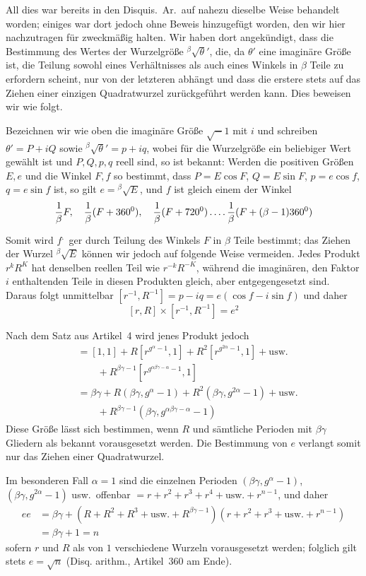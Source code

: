 \clearpage
{}
All dies war bereits in den Disquis.\ Ar.\ auf nahezu dieselbe Weise behandelt worden; einiges war dort jedoch ohne Beweis hinzugefügt worden, den wir hier nachzutragen für zweckmäßig halten. Wir haben dort angekündigt, dass die Bestimmung des Wertes der Wurzelgröße ${}^{\beta}\!\surd\theta'$, die, da $\theta'$ eine imaginäre Größe ist, die Teilung sowohl eines Verhältnisses als auch eines Winkels in $\beta$ Teile zu erfordern scheint, nur von der letzteren abhängt und dass die erstere stets auf das Ziehen einer einzigen Quadratwurzel zurückgeführt werden kann. Dies beweisen wir wie folgt.

Bezeichnen wir wie oben die imaginäre Größe $\surd-1$ mit $i$ und schreiben $\theta'=P+iQ$ sowie ${}^{\beta}\!\surd\theta'=p+iq$, wobei für die Wurzelgröße ein beliebiger Wert gewählt ist und $P,Q,p,q$ reell sind, so ist bekannt: Werden die positiven Größen $E,e$ und die Winkel $F,f$ so bestimmt, dass $P=E\cos F$, $Q=E\sin F$, $p=e\cos f$, $q=e\sin f$ ist, so gilt $e={}^{\beta}\!\surd E$, und $f$ ist gleich einem der Winkel
\[
\frac1\beta F,\quad\frac1\beta(F+360^0),\quad\frac1\beta(F+720^0)\mathinner{.\,.\,.\,.}\frac1\beta(F+(\beta-1)360^0)
\]
Somit wird $f$\textsuperscript{.}\ ger durch Teilung des Winkels $F$ in $\beta$ Teile bestimmt; das Ziehen der Wurzel ${}^{\beta}\!\surd E$ können wir jedoch auf folgende Weise vermeiden. Jedes Produkt $r^kR^K$ hat denselben reellen Teil wie $r^{-k}R^{-K}$, während die imaginären, den Faktor $i$ enthaltenden Teile in diesen Produkten gleich, aber entgegengesetzt sind. Daraus folgt unmittelbar $[r^{-1},R^{-1}]=p-iq=e(\cos f-i\sin f)$ und daher
\[
[r,R]\times[r^{-1},R^{-1}]=e^2
\]

Nach dem Satz aus Artikel~4 wird jenes Produkt jedoch
\[
\begin{aligned}
&{}=[1,1]+R[r^{g^\alpha-1},1]+R^2[r^{g^{2\alpha}-1},1]+\text{usw.}\\
&\qquad{}+R^{\beta\gamma-1}[r^{g^{\alpha\beta\gamma-\alpha}-1},1]\\
&{}=\beta\gamma+R(\beta\gamma,g^\alpha-1)+R^2(\beta\gamma,g^{2\alpha}-1)+\text{usw.}\\
&\qquad{}+R^{\beta\gamma-1}(\beta\gamma,g^{\alpha\beta\gamma-\alpha}-1)
\end{aligned}
\]
Diese Größe lässt sich bestimmen, wenn $R$ und sämtliche Perioden mit $\beta\gamma$ Gliedern als bekannt vorausgesetzt werden. Die Bestimmung von $e$ verlangt somit nur das Ziehen einer Quadratwurzel.

Im besonderen Fall $\alpha=1$ sind die einzelnen Perioden $(\beta\gamma,g^\alpha-1)$, $(\beta\gamma,g^{2\alpha}-1)$ usw.\ offenbar $=r+r^2+r^3+r^4+\text{usw.}+r^{n-1}$, und daher
\[
\begin{aligned}
ee&=\beta\gamma+(R+R^2+R^3+\text{usw.}+R^{\beta\gamma-1})(r+r^2+r^3+\text{usw.}+r^{n-1})\\
&=\beta\gamma+1=n
\end{aligned}
\]
sofern $r$ und $R$ als von $1$ verschiedene Wurzeln vorausgesetzt werden; folglich gilt stets $e=\surd n$ (Disq. arithm., Artikel~360 am Ende).

